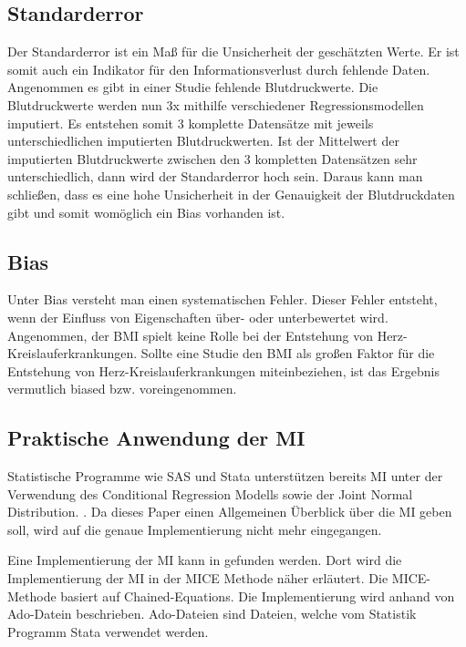 \subsection{Standarderror}

Der Standarderror ist ein Maß für die Unsicherheit der 
geschätzten Werte. \autocite[1098]{Donders2006} Er ist somit auch ein Indikator für den Informationsverlust durch fehlende Daten. \autocite[1298]{Hughes2019}
Angenommen es gibt in einer Studie fehlende Blutdruckwerte. Die Blutdruckwerte werden nun 3x mithilfe verschiedener Regressionsmodellen imputiert.
Es entstehen somit 3 komplette Datensätze mit jeweils unterschiedlichen imputierten Blutdruckwerten. Ist der Mittelwert der imputierten Blutdruckwerte zwischen den 3 kompletten
Datensätzen sehr unterschiedlich, dann wird der Standarderror hoch sein. Daraus kann man schließen, dass es eine hohe Unsicherheit in der Genauigkeit der Blutdruckdaten gibt und
somit womöglich ein Bias vorhanden ist.   

\subsection{Bias}

Unter Bias versteht man einen systematischen Fehler. Dieser Fehler entsteht, 
wenn der Einfluss von Eigenschaften über- oder unterbewertet wird. \autocite[2]{Jakobsen2017} Angenommen, der BMI 
spielt keine Rolle bei der Entstehung von Herz-Kreislauferkrankungen. Sollte eine Studie den BMI als großen Faktor 
für die Entstehung von Herz-Kreislauferkrankungen miteinbeziehen, ist das Ergebnis vermutlich biased bzw. voreingenommen.

\subsection{Praktische Anwendung der MI}

Statistische Programme wie SAS und Stata unterstützen bereits MI unter der Verwendung des Conditional Regression Modells 
sowie der Joint Normal Distribution. \autocite[164]{Lee2014}. Da dieses Paper einen Allgemeinen Überblick über die MI 
geben soll, wird auf die genaue Implementierung nicht mehr eingegangen. 

Eine Implementierung der MI kann in \textcite[]{Royston2005} gefunden werden. Dort wird die Implementierung der MI in der MICE Methode 
näher erläutert. Die MICE-Methode basiert auf Chained-Equations. Die Implementierung wird anhand von Ado-Datein beschrieben.
Ado-Dateien sind Dateien, welche vom Statistik Programm Stata verwendet werden.

